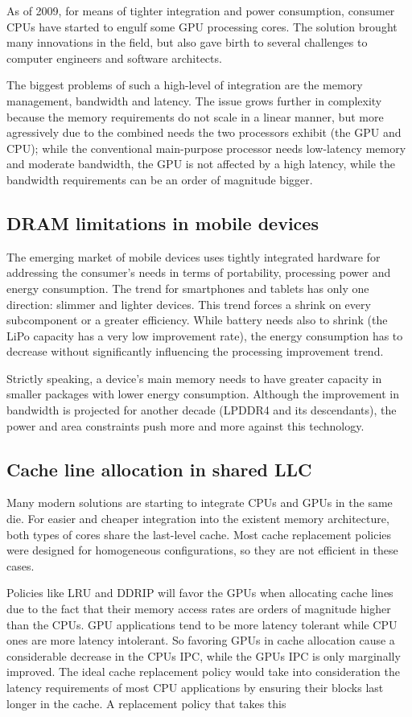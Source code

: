 \documentclass[12pt,journal,compsoc]{IEEEtran}
\begin{document}
As of 2009, for means of tighter integration and power consumption, consumer CPUs have started to engulf some GPU processing cores. The solution brought many innovations in the field, but also gave birth to several challenges to computer engineers and software architects. 

The biggest problems of such a high-level of integration are the memory management, bandwidth and latency. The issue grows further in complexity because the memory requirements do not scale in a linear manner, but more agressively due to the combined needs the two processors exhibit (the GPU and CPU); while the conventional main-purpose processor needs low-latency memory and moderate bandwidth, the GPU is not affected by a high latency, while the bandwidth requirements can be an order of magnitude bigger. 
\subsection{DRAM limitations in mobile devices}
The emerging market of mobile devices uses tightly integrated hardware for addressing the consumer's needs in terms of portability, processing power and energy consumption. The trend for smartphones and tablets has only one direction: slimmer and lighter devices. This trend forces a shrink on every subcomponent or a greater efficiency. While battery needs also to shrink (the LiPo capacity has a very low improvement rate), the energy consumption has to decrease without significantly influencing the processing improvement trend. 

Strictly speaking, a device's main memory needs to have greater capacity in smaller packages with lower energy consumption. Although the improvement in bandwidth is projected for another decade (LPDDR4 and its descendants), the power and area constraints push more and more against this technology.
\subsection{Cache line allocation in shared LLC}
Many modern solutions are starting to integrate CPUs and GPUs in the same die. For easier and cheaper integration into the existent memory architecture, both types of cores share the last-level cache. Most cache replacement policies were designed for homogeneous configurations, so they are not efficient in these cases.

Policies like LRU and DDRIP will favor the GPUs when allocating cache lines due to the fact that their memory access rates are orders of magnitude higher than the CPUs. GPU applications tend to be more latency tolerant while CPU ones are more latency intolerant. So favoring GPUs in cache allocation cause a considerable decrease in the CPUs IPC, while the GPUs IPC is only marginally improved. The ideal cache replacement policy would take into consideration the latency requirements of most CPU applications by ensuring their blocks last longer in the cache.
A replacement policy that takes this
\end{document}
